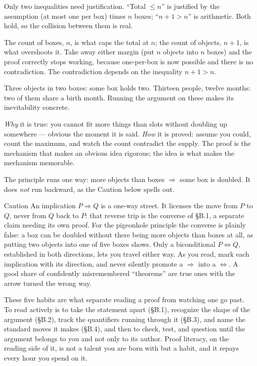 \documentclass[a4paper,12pt,oneside]{memoir}
\begin{document}
\begin{sollist}
  \item {} Only two inequalities need justification. “Total \(\le n\)” is justified by the assumption (at most one per box) times \(n\) boxes; “\(n + 1 > n\)” is arithmetic. Both hold, so the collision between them is real.
  \item {} The count of boxes, \(n\), is what caps the total at \(n\); the count of objects, \(n + 1\), is what overshoots it. Take away either margin (put \(n\) objects into \(n\) boxes) and the proof correctly stops working, because one-per-box is now possible and there is no contradiction. The contradiction depends on the inequality \(n + 1 > n\).
  \item {} Three objects in two boxes: some box holds two. Thirteen people, twelve months: two of them share a birth month. Running the argument on these makes its inevitability concrete.
  \item {} \emph{Why} it is true: you cannot fit more things than slots without doubling up somewhere — obvious the moment it is said. \emph{How} it is proved: assume you could, count the maximum, and watch the count contradict the supply. The proof is the mechanism that makes an obvious idea rigorous; the idea is what makes the mechanism memorable.
  \item {} The principle runs one way: more objects than boxes \(\Rightarrow\) some box is doubled. It does \emph{not} run backward, as the Caution below spells out.
\end{sollist}
\begin{envcaution}{Caution}{}{}
An implication \(P \Rightarrow Q\) is a one-way street. It licenses the move from \(P\) to \(Q\), never from \(Q\) back to \(P\): that reverse trip is the converse of §B.1, a separate claim needing its own proof. For the pigeonhole principle the converse is plainly false: a box can be doubled without there being more objects than boxes at all, as putting two objects into one of five boxes shows. Only a biconditional \(P \Leftrightarrow Q\), established in both directions, lets you travel either way. As you read, mark each implication with its direction, and never silently promote a \(\Rightarrow\) into a \(\Leftrightarrow\). A good share of confidently misremembered “theorems” are true ones with the arrow turned the wrong way.
\end{envcaution}
These five habits are what separate reading a proof from watching one go past. To read actively is to take the statement apart (§B.1), recognize the shape of the argument (§B.2), track the quantifiers running through it (§B.3), and name the standard moves it makes (§B.4), and then to check, test, and question until the argument belongs to you and not only to its author. Proof literacy, on the reading side of it, is not a talent you are born with but a habit, and it repays every hour you spend on it.
\end{document}
